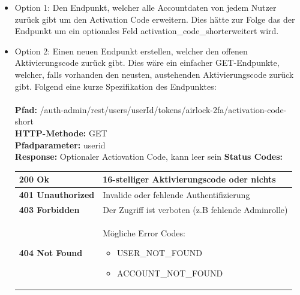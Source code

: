 \begin{itemize}
	\item Option 1: Den Endpunkt, welcher alle Accountdaten von jedem Nutzer zurück gibt um den Activation Code erweitern. Dies hätte zur Folge das der Endpunkt um ein optionales Feld \flqq activation\_code\_short\frqq{}\space erweitert wird.
	\label{"itm:restOption1"}
	\item Option 2: Einen neuen Endpunkt erstellen, welcher den offenen Aktivierungscode zurück gibt. Dies wäre ein einfacher GET-Endpunkte, welcher, falls vorhanden den neusten, austehenden Aktivierungscode zurück gibt. Folgend eine kurze Spezifikation des Endpunktes:\\\\

	\textbf{Pfad:} /auth-admin/rest/users/{userId}/tokens/airlock-2fa/activation-code-short\\
	\textbf{HTTP-Methode:} GET\\
	\textbf{Pfadparameter:} userid\\
	\textbf{Response:} Optionaler Actiovation Code, kann leer sein \newline
	\textbf{Status Codes:}
	\begin{longtable}{p{}|p{}}
		\hline
		\textbf{200 Ok}    				& 16-stelliger Aktivierungscode oder nichts \\
		\hline
		\textbf{401 Unauthorized}   				& Invalide oder fehlende Authentifizierung\\
		\hline
		\textbf{403 Forbidden}	& Der Zugriff ist verboten (z.B fehlende Adminrolle) \\
		\hline
		\textbf{404 Not Found}	& Mögliche Error Codes:
		\begin{itemize}
			\item USER\_NOT\_FOUND 
			\item ACCOUNT\_NOT\_FOUND
		\end{itemize}\\
		\hline
	\end{longtable} 
	
	\label{"itm:restOption2"}	
\end{itemize}


